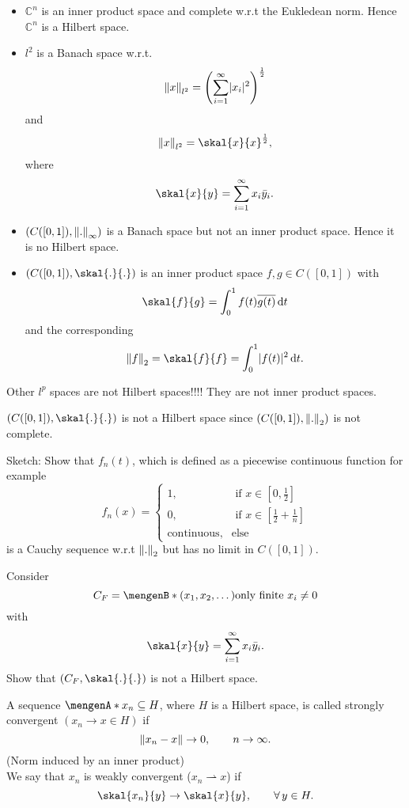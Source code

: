 \begin{beispiele}
	\begin{itemize}
		\item $\mathbb{C}^n$ is an inner product space and complete w.r.t the Eukledean norm. Hence $\mathbb{C}^n$ is a Hilbert space.
		\item $l^2$ is a Banach space w.r.t. 
		\[
			\norm{x}_{l^2} = \left( \sum_{i=1}^{\infty} \abs{x_i}^2 \right)^{\frac{1}{2}}
		\]
		and
		\[
			\norm{x}_{l^2} = \skal{x}{x}^{\frac{1}{2}},
		\]
		where
		\[
			\skal{x}{y} = \sum_{i=1}^{\infty} x_i \bar{y}_i.
		\]
		\item $(C([0,1]), \norm{.}_{\infty})$ is a Banach space but not an inner product space. Hence it is no Hilbert space.
		\item $(C([0,1]),\skal{.}{.})$ is an inner product space $f,g \in C([0,1])$ with
		\[
			\skal{f}{g} = \int_{0}^{1} f(t) \overline{g(t)} \,\mathrm{d}t
		\]
		and the corresponding
		\[
			\norm{f}_2 = \skal{f}{f} = \int_{0}^{1} \abs{f(t)}^2 \,\mathrm{d}t.
		\]
	\end{itemize}
\end{beispiele}
\begin{bemerkung}
	Other $l^p$ spaces are not Hilbert spaces!!!! They are not inner product spaces.
\end{bemerkung}

\begin{satz}
	$(C([0,1]), \skal{.}{.})$ is not a Hilbert space since $(C([0,1]), \norm{.}_2)$ is not complete.
\end{satz}

\begin{beweis}
	Sketch: Show that $f_n(t)$, which is defined as a piecewise continuous function for example
	\[
		f_n(x)= \begin{cases}
			1, &\text{ if }x \in [0,\frac{1}{2}]\\
			0, &\text{ if }x \in [\frac{1}{2} + \frac{1}{n}] \\
			\text{continuous}, & \text{else} 
		\end{cases}
	\] is a Cauchy sequence w.r.t $\norm{.}_2$ but has no limit in $C([0,1])$.
\end{beweis}

Consider
\[
	C_F = \set[(x_1,x_2,\dots)]{\text{only finite }x_i \neq 0} 
\]
with \[
	\skal{x}{y} = \sum_{i=1}^{\infty} x_i \bar{y}_i.
\]
Show that $(C_F, \skal{.}{.})$ is not a Hilbert space.

\begin{definition}
	A sequence $\set{x_n} \subseteq H$, where $H$ is a Hilbert space, is called strongly convergent $(x_n \to x \in H)$ if 
	\[
		\norm{x_n -x} \to 0, \qquad n \to  \infty.
	\]
	(Norm induced by an inner product) \\ We say that $x_n$ is weakly convergent ($x_n \rightharpoonup x$) if
	\[
		\skal{x_n}{y} \to \skal{x}{y}, \qquad \forall\, y \in H.
	\]
\end{definition}

